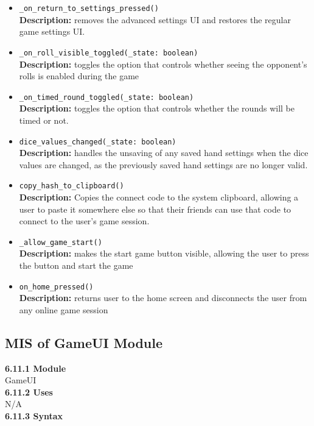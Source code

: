 \documentclass[12pt, titlepage]{article}
\begin{document}
\begin{itemize}
	\item \texttt{\_on\_return\_to\_settings\_pressed() }\\
	\textbf{Description:} removes the advanced settings UI and restores the regular game settings UI.
	\item \texttt{\_on\_roll\_visible\_toggled(\_state: boolean) }\\
	\textbf{Description:} toggles the option that controls whether seeing the opponent's rolls is enabled during the game 
	\item \texttt{\_on\_timed\_round\_toggled(\_state: boolean) }\\
	\textbf{Description:} toggles the option that controls whether the rounds will be timed or not.
	\item \texttt{dice\_values\_changed(\_state: boolean) }\\
	\textbf{Description:} handles the unsaving of any saved hand settings when the dice values are changed, as the previously saved hand settings are no longer valid.
	\item \texttt{copy\_hash\_to\_clipboard() }\\
	\textbf{Description:} Copies the connect code to the system clipboard, allowing a user to paste it somewhere else so that their friends can use that code to connect to the user's game session.
	\item \texttt{\_allow\_game\_start() }\\
	\textbf{Description:} makes the start game button visible, allowing the user to press the button and start the game
	\item \texttt{on\_home\_pressed() }\\
	\textbf{Description:} returns user to the home screen and disconnects the user from any online game session
	 
	
	
\end{itemize}

\subsection{MIS of GameUI Module}\label{GameUI}
\textbf{6.11.1 Module}\\
 GameUI\\

\noindent \textbf{6.11.2 Uses}\\
N/A \\

\noindent \textbf{6.11.3 Syntax}
\end{document}
